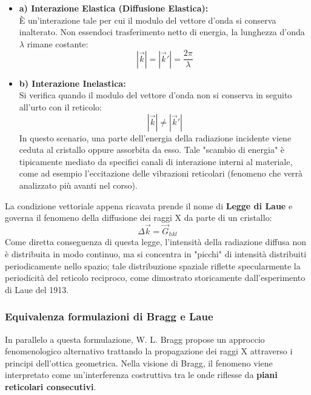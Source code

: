 \begin{itemize}
    \item \textbf{a) Interazione Elastica (Diffusione Elastica):} \\
    È un'interazione tale per cui il modulo del vettore d'onda si conserva inalterato. Non essendoci trasferimento netto di energia, la lunghezza d'onda \(\lambda\) rimane costante:
    \begin{equation}
        |\vec{k}| = |\vec{k}'| = \frac{2\pi}{\lambda}
    \end{equation}

    \item \textbf{b) Interazione Inelastica:} \\
    Si verifica quando il modulo del vettore d'onda non si conserva in seguito all'urto con il reticolo:
    \begin{equation}
        |\vec{k}| \neq |\vec{k}'|
    \end{equation}
    In questo scenario, una parte dell'energia della radiazione incidente viene ceduta al cristallo oppure assorbita da esso. Tale "scambio di energia" è tipicamente mediato da specifici canali di interazione interni al materiale, come ad esempio l'eccitazione delle vibrazioni reticolari (fenomeno che verrà analizzato più avanti nel corso).
\end{itemize}

La condizione vettoriale appena ricavata prende il nome di \textbf{Legge di Laue} e governa il fenomeno della diffusione dei raggi X da parte di un cristallo:
\begin{equation}
    \Delta\vec{k} = \vec{G}_{hkl}
\end{equation}
Come diretta conseguenza di questa legge, l'intensità della radiazione diffusa non è distribuita in modo continuo, ma si concentra in "picchi" di intensità distribuiti periodicamente nello spazio; tale distribuzione spaziale riflette specularmente la periodicità del reticolo reciproco, come dimostrato storicamente dall'esperimento di Laue del 1913.

\subsubsection{Equivalenza formulazioni di Bragg e Laue}

In parallelo a questa formulazione, W. L. Bragg propose un approccio fenomenologico alternativo trattando la propagazione dei raggi X attraverso i principi dell'ottica geometrica. Nella visione di Bragg, il fenomeno viene interpretato come un'interferenza costruttiva tra le onde riflesse da \textbf{piani reticolari consecutivi}. 

